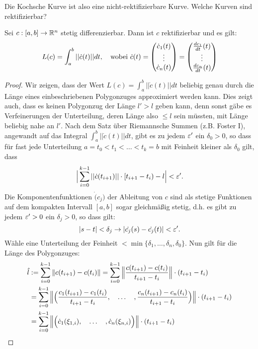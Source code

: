 \documentclass[11pt]{scrbook}
\begin{document}
Die Kochsche Kurve ist also eine nicht-rektifizierbare Kurve. Welche Kurven sind rektifizierbar?

\begin{st}
\label{1.5}
Sei $c: [a,b] \to \mathbb{R}^n$ stetig differenzierbar. Dann ist $c$ rektifizierbar und es gilt:
\[ 
	L(c) = \int_a^b ||\dot{c} (t)|| dt , \quad \text{wobei } \dot{c} (t) = \begin{pmatrix} \dot c_1(t) \\ \vdots \\ \dot c_n(t) \end{pmatrix} = \begin{pmatrix} \frac{dc_1}{dt} (t) \\ \vdots \\  \frac{dc_n}{dt} (t) \end{pmatrix}
\]
\begin{proof}
Wir zeigen, dass der Wert $L(c) = \int_a^b ||\dot{c} (t)|| dt$ beliebig genau durch die Länge eines einbeschriebenen Polygonzuges approximiert werden kann. Dies zeigt auch, dass es keinen Polygonzug der Länge $l' > l$ geben kann, denn sonst gäbe es Verfeinerungen der Unterteilung, deren Länge also $\le l$ sein müssten, mit Länge beliebig nahe an $l'$. Nach dem Satz über Riemannsche Summen (z.B. Foster I), angewandt auf das Integral $\int_a^b ||\dot{c} (t)|| dt$, gibt es zu jedem $\varepsilon'$ ein $\delta_0> 0$, so dass für fast jede Unterteilung $a = t_0 < t_1 < \dots < t_k = b$ mit Feinheit kleiner als $\delta_0$ gilt, dass
\[ \Big | \sum_{i=0}^{k-1} ||\dot{c} (t_{i+1})|| \cdot [t_{i+1} - t_i) - l\Big | < \varepsilon'. \]
Die Komponentenfunktionen $\dot(c_j)$ der Ableitung von $c$ sind als stetige Funktionen auf dem kompakten Intervall $[a,b]$ sogar gleichmäßig stetig, d.h. es gibt zu jedem $\varepsilon' > 0$ ein $\delta_j > 0$, so dass gilt:
\[ |s - t| < \delta_j  \rightarrow |\dot{c_j}(s) - \dot{c_j}(t)| < \varepsilon' .\]
Wähle eine Unterteilung der Feinheit $< \min \{ \delta_1, \dots, \delta_n, \delta_0 \}$. Nun gilt für die Länge des Polygonzuges:
\begin{align*}
 \hat l &:= \sum_{i=0}^{k-1} \|c(t_{i+1}) - c(t_i)\|  = \sum_{i=0}^{k-1} \Big \|  \f{c(t_{i+1}) - c(t_i)}{t_{i+1}-t_i} \Big \| \cdot (t_{i+1} - t_i) \\
 &= \sum_{i=0}^{k-1} \Big \| \Big (  \f{c_1(t_{i+1}) - c_1(t_i)}{t_{i+1}-t_i}, \quad \dots \quad , \f{c_n(t_{i+1}) - c_n(t_i)}{t_{i+1}-t_i} \Big ) \Big \| \cdot (t_{i+1} - t_i) \\
 &= \sum_{i=0}^{k-1} \Big \| \Big (  \dot c_1(\xi_{1,i}), \quad \dots \quad , \dot c_n(\xi_{n,i}) \Big ) \Big \| \cdot (t_{i+1} - t_i)

\end{align*}
\end{proof}
\end{st}
\end{document}
